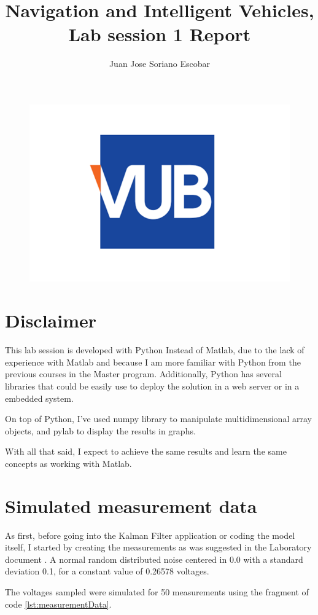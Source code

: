 \documentclass{article}
\begin{document}
    \begin{figure}
        \centering
        \includegraphics[width=0.5\linewidth]{./img/vub.png}
    \end{figure}
    \title{Navigation and Intelligent Vehicles, Lab session 1 Report}
    \author{Juan Jose Soriano Escobar }
    \maketitle
    \newpage

    \section*{Disclaimer}

    This lab session is developed with Python Instead of Matlab, due to the lack of experience with Matlab
    and because I am more familiar with Python from the previous courses in the Master program. Additionally,
    Python has several libraries that could be easily use to deploy the solution in a web server or in a embedded system.

    On top of Python, I've used numpy library to manipulate multidimensional array objects, and pylab to display the results in graphs. 

    With all that said, I expect to achieve the same results and learn the same concepts as working with Matlab.

    \section{Simulated measurement data}
    

    As  first, before going into the Kalman Filter application  or coding the model itself, I started by creating the measurements
    as was suggested in the Laboratory document \cite{LabManual}. A normal random distributed noise centered in 0.0 with a standard deviation 0.1, 
    for a constant value of 0.26578 voltages.

    The voltages sampled were simulated for 50 measurements using the fragment of code \ref{lst:measurementData}.
\end{document}
